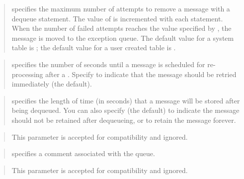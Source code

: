 \documentclass[letterpaper,10pt,english,openany,oneside]{sphinxmanual}
\begin{document}
\begin{quote}

 specifies the maximum number of attempts to
remove a message with a dequeue statement. The value of
 is incremented with each  statement.
When the number of failed attempts reaches the value specified by
, the message is moved to the exception queue.
The default value for a system table is ; the default value for a
user created table is .
\end{quote}

\begin{quote}

 specifies the number of seconds until a message is
scheduled for re-processing after a . Specify  to indicate
that the message should be retried immediately (the default).
\end{quote}

\begin{quote}

 specifies the length of time (in seconds) that a
message will be stored after being dequeued. You can also specify 
(the default) to indicate the message should not be retained after
dequeueing, or  to retain the message forever.
\end{quote}

\begin{quote}

This parameter is accepted for compatibility and ignored.
\end{quote}

\begin{quote}

 specifies a comment associated with the queue.
\end{quote}

\begin{quote}

This parameter is accepted for compatibility and ignored.
\end{quote}
\end{document}
